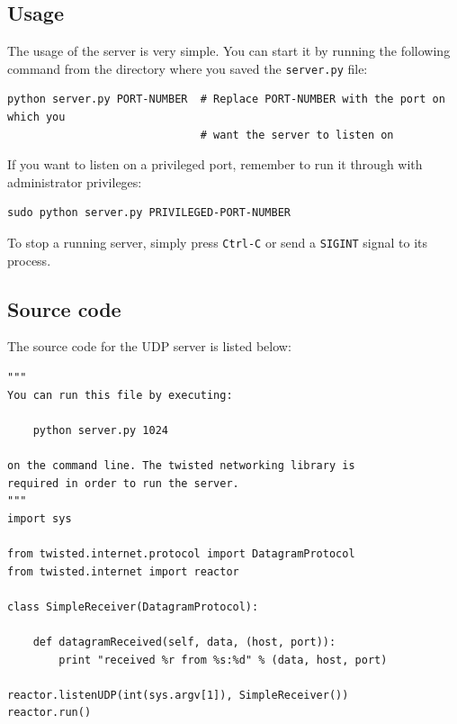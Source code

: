 \documentclass[10pt,a4paper,twoside,onecolumn]{article}
\begin{document}
\subsection{Usage}

The usage of the server is very simple. You can start it by running the following command from the directory where you saved the \texttt{server.py} file:
\lstset{caption=,label=,language=bash}
\begin{lstlisting}
python server.py PORT-NUMBER  # Replace PORT-NUMBER with the port on which you
                              # want the server to listen on
\end{lstlisting}

If you want to listen on a privileged port, remember to run it through with administrator privileges:

\begin{lstlisting}
sudo python server.py PRIVILEGED-PORT-NUMBER
\end{lstlisting}

To stop a running server, simply press \texttt{Ctrl-C} or send a \texttt{SIGINT} signal to its process.



\subsection{Source code}
\label{sec:src-code}

The source code for the UDP server is listed below:

\lstset{caption=,label=lst:udp-server,language=python,numbers=left}
\begin{lstlisting}
"""
You can run this file by executing:

    python server.py 1024

on the command line. The twisted networking library is
required in order to run the server.
"""
import sys

from twisted.internet.protocol import DatagramProtocol
from twisted.internet import reactor

class SimpleReceiver(DatagramProtocol):

    def datagramReceived(self, data, (host, port)):
        print "received %r from %s:%d" % (data, host, port)

reactor.listenUDP(int(sys.argv[1]), SimpleReceiver())
reactor.run()
\end{lstlisting}
\end{document}
